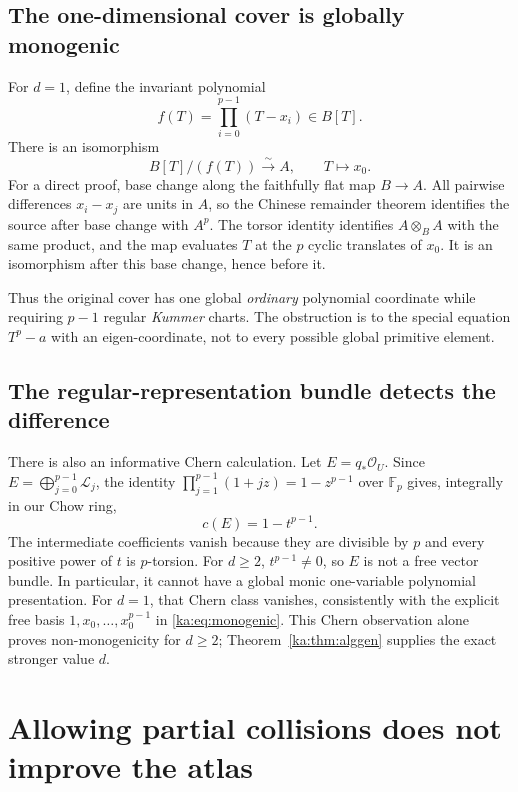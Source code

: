 \documentclass[11pt,a4paper]{article}
\theoremstyle{definition}
\theoremstyle{remark}
\newcommand{\F}{\mathbb F}
\newcommand{\OO}{\mathcal O}
\newcommand{\LL}{\mathcal L}
\begin{document}
\subsection{The one-dimensional cover is globally monogenic}
For $d=1$, define the invariant polynomial
\begin{equation}
 f(T)=\prod_{i=0}^{p-1}(T-x_i)\in B[T].
 \label{ka:eq:ordinarypoly}
\end{equation}
There is an isomorphism
\begin{equation}
 B[T]/(f(T))\xrightarrow{\sim} A,
 \qquad T\longmapsto x_0.
 \label{ka:eq:monogenic}
\end{equation}
For a direct proof, base change along the faithfully flat map $B\to A$.
All pairwise differences $x_i-x_j$ are units in $A$, so the Chinese
remainder theorem identifies the source after base change with $A^p$.
The torsor identity identifies $A\otimes_B A$ with the same product,
and the map evaluates $T$ at the $p$ cyclic translates of $x_0$.
It is an isomorphism after this base change, hence before it.

Thus the original cover has one global \emph{ordinary} polynomial
coordinate while requiring $p-1$ regular \emph{Kummer} charts. The
obstruction is to the special equation $T^p-a$ with an eigen-coordinate,
not to every possible global primitive element.

\subsection{The regular-representation bundle detects the difference}
There is also an informative Chern calculation. Let $E=q_*\OO_U$.
Since $E=\bigoplus_{j=0}^{p-1}\LL_j$, the identity
$\prod_{j=1}^{p-1}(1+jz)=1-z^{p-1}$ over $\F_p$ gives, integrally
in our Chow ring,
\begin{equation}
 c(E)=1-t^{p-1}.
 \label{ka:eq:regularbundle}
\end{equation}
The intermediate coefficients vanish because they are divisible by $p$
and every positive power of $t$ is $p$-torsion. For $d\geq2$,
$t^{p-1}\neq0$, so $E$ is not a free vector bundle. In particular,
it cannot have a global monic one-variable polynomial presentation.
For $d=1$, that Chern class vanishes, consistently with the explicit
free basis $1,x_0,\ldots,x_0^{p-1}$ in \eqref{ka:eq:monogenic}.
This Chern observation alone proves non-monogenicity for $d\geq2$;
Theorem~\ref{ka:thm:alggen} supplies the exact stronger value $d$.

\section{Allowing partial collisions does not improve the atlas}
\label{ka:sec:robustness}
\end{document}
